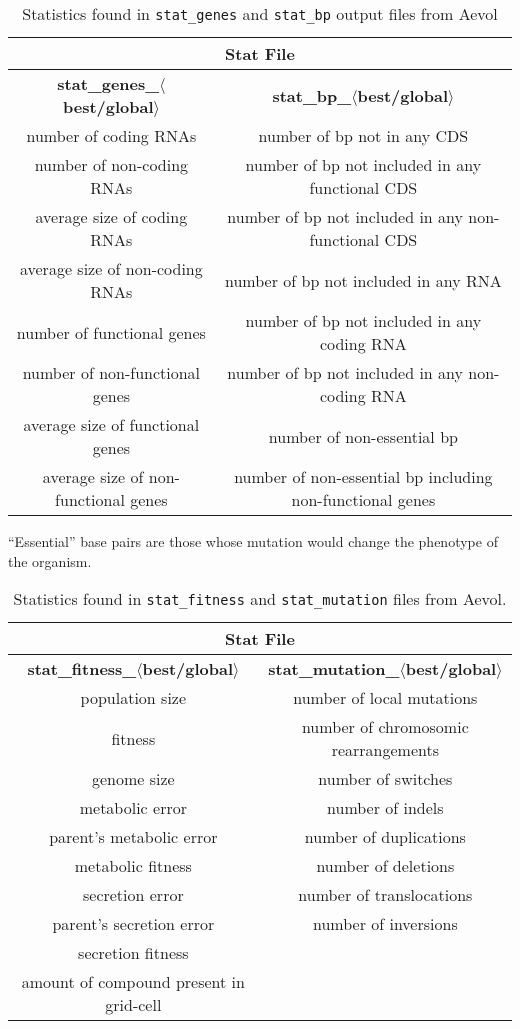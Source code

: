 \begin{table}[H]
\centering
\begin{tabular}{ |c|c| }
	\hline
	\multicolumn{2}{|c|}{\textbf{Stat File}} \\
	\hline
	\textbf{stat\_genes\_$\langle$best/global$\rangle$} & \textbf{stat\_bp\_$\langle$best/global$\rangle$} \\
	\hline \hline
	number of coding RNAs & number of bp not in any CDS \\
	\hline
	number of non-coding RNAs & number of bp not included in any functional CDS \\
	\hline
	average size of coding RNAs & number of bp not included in any non-functional CDS \\
	\hline
	average size of non-coding RNAs & number of bp not included in any RNA \\
	\hline
	number of functional genes & number of bp not included in any coding RNA \\
	\hline
	number of non-functional genes & number of bp not included in any non-coding RNA \\
	\hline
	average size of functional genes & number of non-essential bp \\
	\hline
	average size of non-functional genes & number of non-essential bp including non-functional genes \\
	\hline
\end{tabular}
\caption[Aevol's stats - genes and base pairs]{Statistics found in \texttt{stat\_genes} and \texttt{stat\_bp} output files from Aevol}
\label{table:aevol_stats_genes_and_bp}
\end{table}
``Essential'' base pairs are those whose mutation would change the phenotype of the organism.
\begin{table}[H]
	\centering
	\begin{tabular}{ |c|c| }
		\hline
		\multicolumn{2}{|c|}{\textbf{Stat File}} \\
		\hline
		\textbf{stat\_fitness\_$\langle$best/global$\rangle$} &
		\textbf{stat\_mutation\_$\langle$best/global$\rangle$} \\
		\hline \hline
		population size & number of local mutations \\
		fitness & number of chromosomic rearrangements \\
		genome size & number of switches \\
		metabolic error & number of indels \\
		parent's metabolic error & number of duplications \\
		metabolic fitness & number of deletions \\
		secretion error & number of translocations \\
		parent's secretion error & number of inversions \\
		secretion fitness & \\ 
		amount of compound present in grid-cell & \\
		\hline
	\end{tabular}	
	\caption[Aevol's stats - fitness and mutation]{Statistics found in \texttt{stat\_fitness} and \texttt{stat\_mutation} files from Aevol.}
	\label{table:aevol_stats_fitness_and_mutation}
\end{table}
 

